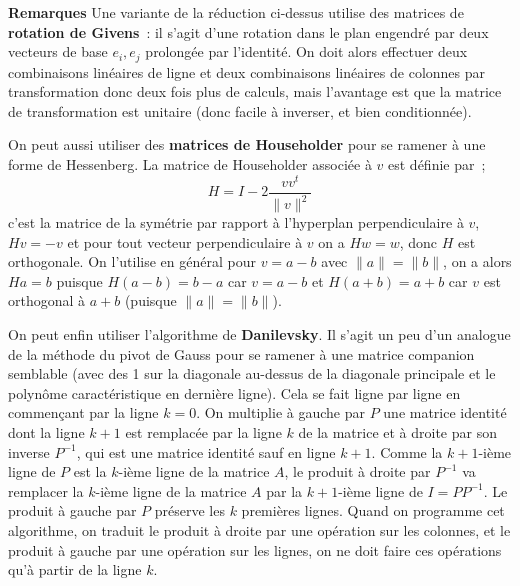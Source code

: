 \documentclass[a4paper,11pt]{article}
\begin{document}
\begin{giacjshere}
{\bf Remarques}
Une variante de la r\'eduction ci-dessus utilise des matrices de
{\bf rotation de Givens}~: il s'agit d'une rotation
dans le plan engendr\'e par deux vecteurs de base $e_i,e_j$ 
prolong\'ee par l'identit\'e. On doit alors effectuer 
deux combinaisons lin\'eaires de ligne
et deux combinaisons lin\'eaires de colonnes par transformation
donc deux fois plus de calculs, mais l'avantage est que la matrice
de transformation est unitaire (donc facile \`a inverser, et bien
conditionn\'ee).

On peut aussi utiliser des {\bf matrices de
Householder} 
pour  se ramener \`a une forme de Hessenberg.
La matrice de Householder associ\'ee \`a $v$ est d\'efinie par~;
$$H=I-2\frac{v v^t}{\|v\|^2}$$
c'est la matrice de la sym\'etrie par rapport \`a l'hyperplan 
perpendiculaire \`a $v$, $Hv=-v$ et pour tout vecteur
perpendiculaire \`a $v$ on a $Hw=w$, donc $H$ est orthogonale.
On l'utilise en g\'en\'eral pour $v=a-b$ avec $\|a\|=\|b\|$,
on a alors $Ha=b$ puisque $H(a-b)=b-a$ car $v=a-b$ et $H(a+b)=a+b$
car $v$ est orthogonal \`a $a+b$ (puisque $\|a\|=\|b\|$).

On peut enfin utiliser l'algorithme de {\bf Danilevsky}. 
Il s'agit un peu
d'un analogue de la m\'ethode du pivot de Gauss pour se ramener
\`a une matrice companion semblable (avec des 1 sur
la diagonale au-dessus de la diagonale
principale et le polyn\^ome caract\'eristique en derni\`ere
ligne). Cela se fait ligne par ligne en commen\c{c}ant par
la ligne $k=0$. On multiplie \`a gauche par $P$ une matrice identit\'e
dont la ligne $k+1$ est remplac\'ee par la ligne $k$ de la matrice
et \`a droite par son inverse $P^{-1}$, qui est une matrice identit\'e sauf
en ligne $k+1$. Comme la $k+1$-i\`eme ligne de $P$ est la $k$-i\`eme
ligne de la matrice $A$, le produit \`a droite par $P^{-1}$ va remplacer
la $k$-i\`eme ligne de la matrice $A$ par la $k+1$-i\`eme ligne de $I=PP^{-1}$.
Le produit \`a gauche par $P$ pr\'eserve les $k$ premi\`eres lignes.
Quand on programme cet algorithme, on traduit le produit \`a droite
par une op\'eration sur les colonnes, et le produit \`a gauche par
une op\'eration sur les lignes, on ne doit faire ces op\'erations qu'\`a 
partir de la ligne $k$.


\end{giacjshere}
\end{document}
